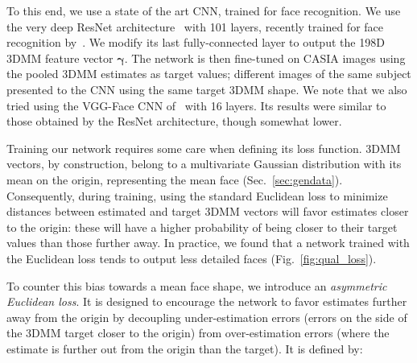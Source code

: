 \documentclass[10pt,twocolumn,letterpaper]{article}
\newcommand{\minisection}[1]{\vspace{1mm}\noindent{\bf #1}}
\begin{document}
To this end, we use a state of the art CNN, trained for face recognition. We use the very deep ResNet architecture~\cite{He_2016_CVPR} with 101 layers, recently trained for face recognition by~\cite{masi16dowe}. We modify its last fully-connected layer to output the 198D 3DMM feature vector $\boldsymbol{\gamma}$. The network is then fine-tuned on CASIA images using the pooled 3DMM estimates as target values; different images of the same subject presented to the CNN using the same target 3DMM shape. We note that we also tried using the VGG-Face CNN of~\cite{parkhi2015deep} with 16 layers. Its results were similar to those obtained by the ResNet architecture, though somewhat lower. 

\minisection{The asymmetric Euclidean loss.} Training our network requires some care when defining its loss function. 3DMM vectors, by construction, belong to a multivariate Gaussian distribution with its mean on the origin, representing the mean face (Sec.~\ref{sec:gendata}). Consequently, during training, using the standard Euclidean loss to minimize distances between estimated and target 3DMM vectors will favor estimates closer to the origin: these will have a higher probability of being closer to their target values than those further away. In practice, we found that a network trained with the Euclidean loss tends to output less detailed faces (Fig.~\ref{fig:qual_loss}).

To counter this bias towards a mean face shape, we introduce an {\em asymmetric Euclidean loss}. It is designed to encourage the network to favor estimates further away from the origin by decoupling under-estimation errors (errors on the side of the 3DMM target closer to the origin) from over-estimation errors (where the estimate is further out from the origin than the target). It is defined by:
\vspace{-3mm}
\end{document}
